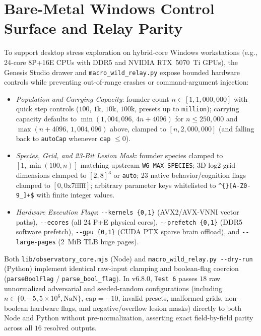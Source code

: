 \documentclass[11pt,reqno]{amsart}
\theoremstyle{definition}
\newcommand{\code}[1]{{\footnotesize\nolinkurl{#1}}}
\begin{document}
\section{Bare-Metal Windows Control Surface and Relay Parity}
\label{sec:baremetal}

To support desktop stress exploration on hybrid-core Windows workstations (e.g., 24-core 8P+16E CPUs with DDR5 and NVIDIA RTX~5070~Ti GPUs), the Genesis Studio drawer and \code{macro\_wild\_relay.py} expose bounded hardware controls while preventing out-of-range crashes or command-argument injection:
\begin{itemize}[leftmargin=1.5em,itemsep=2pt]
  \item \emph{Population and Carrying Capacity}: founder count $n \in [1, 1{,}000{,}000]$ with quick step controls ($100$, $1\text{k}$, $10\text{k}$, $100\text{k}$, presets up to \code{million}); carrying capacity defaults to $\min(1{,}004{,}096,\, 4n + 4096)$ for $n \le 250{,}000$ and $\max(n + 4096,\, 1{,}004{,}096)$ above, clamped to $[n, 2{,}000{,}000]$ (and falling back to \code{autoCap} whenever \code{cap} $\le 0$).
  \item \emph{Species, Grid, and 23-Bit Lesion Mask}: founder species clamped to $[1, \min(100, n)]$ matching upstream \code{WG\_MAX\_SPECIES}; 3D log2 grid dimensions clamped to $[2, 8]^3$ or \code{auto}; 23 native behavior/cognition flags clamped to $[0, \mathrm{0x7fffff}]$; arbitrary parameter keys whitelisted to \code{\^{}[A-Z0-9\_]+\$} with finite integer values.
  \item \emph{Hardware Execution Flags}: \code{--kernels \{0,1\}} (AVX2/AVX-VNNI vector paths), \code{--ecores} (all 24 P+E physical cores), \code{--prefetch \{0,1\}} (DDR5 software prefetch), \code{--gpu \{0,1\}} (CUDA PTX sparse brain offload), and \code{--large-pages} (2~MiB TLB huge pages).
\end{itemize}
Both \code{lib/observatory\_core.mjs} (Node) and \code{macro\_wild\_relay.py --dry-run} (Python) implement identical raw-input clamping and boolean-flag coercion (\code{parseBoolFlag} / \code{parse\_bool\_flag}). In v6.8.0, \code{Test 6} passes $18$ raw unnormalized adversarial and seeded-random configurations (including $n \in \{0, -5, 5{\times}10^6, \mathrm{NaN}\}$, $\mathrm{cap}=-10$, invalid presets, malformed grids, non-boolean hardware flags, and negative/overflow lesion masks) directly to both Node and Python without pre-normalization, asserting exact field-by-field parity across all $16$ resolved outputs.
\end{document}
